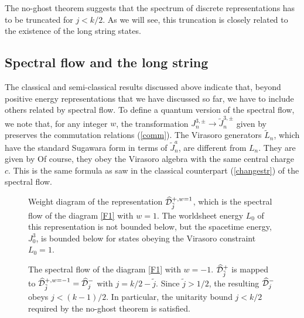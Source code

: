 The no-ghost theorem suggests that the spectrum of
discrete representations has to be truncated for
$j < k/2$. As we will see, this truncation is closely
related to the existence of the long string states. 

\subsection{Spectral flow and the long string}

The classical and semi-classical results discussed above 
indicate that, beyond
 positive energy representations that we have
discussed so far, we have to include others related by 
spectral flow.
To define a quantum version of the
spectral flow, we note that, for any integer $w$,
the transformation
$J_n^{3,\pm} \rightarrow \tilde{J}_n^{3,\pm}$ given by 
preserves the commutation relations (\ref{comm}).
The Virasoro generators $\tilde{L}_n$, which 
have the standard Sugawara form in terms of   $\tilde{J}_n^{a}$,
are different from $L_n$. They are given by 
Of course, they obey the Virasoro algebra with the same central charge $c$.
This is the same formula as saw in the classical counterpart
(\ref{changestr}) of the spectral flow. 



\begin{figure}[htb]
\begin{center}
\epsfxsize=3.8in\leavevmode{}
\end{center}
\caption{Weight diagram of the representation $\widehat {\cal
D}^{+,w=1}_{\tilde j}$, which is the spectral flow of the diagram \ref{F1} with
$w=1$. The worldsheet energy $L_0$ of this representation
is not bounded below, but the spacetime energy, $J^3_0$, is bounded
below for states obeying the Virasoro constraint $L_0=1$.}
\label{F2}
\end{figure} 


\begin{figure}[htb]
\begin{center}
\epsfxsize=3.8in\leavevmode{}
\end{center}
\caption{The spectral flow of the diagram \ref{F1} with
$w=-1$. $\widehat{\cal D}_{\tilde{j}}^+$ is mapped to 
$\widehat{\cal D}_{\tilde j}^{+, w=-1} = \widehat {\cal D}^{-}_{ j}$
with $j = k/2-\tilde{j}$. Since $\tilde{j} > 1/2$, 
the resulting $\widehat {\cal D}_j^-$ obeys $j <  (k-1)/2$.
In particular, the unitarity bound $j < k/2$ required
by the no-ghost theorem is satisfied.}
\label{F3}
\end{figure} 




